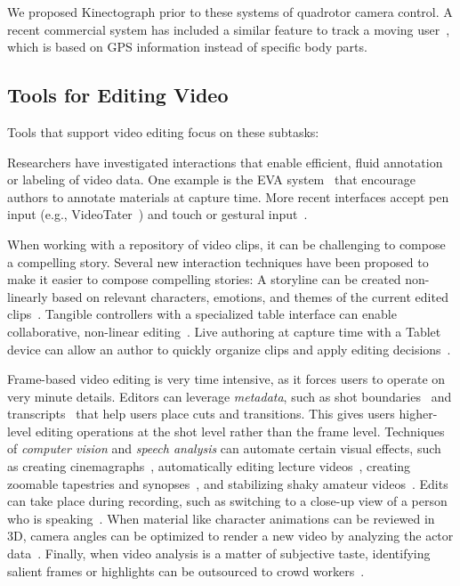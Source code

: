 We proposed Kinectograph prior to these systems of quadrotor camera control. A recent commercial system has included a similar feature to track a moving user~\cite{HexoDrone}, which is based on GPS information instead of specific body parts.


\subsection{Tools for Editing Video}
Tools that support video editing focus on these subtasks:

Researchers have investigated interactions that enable efficient, fluid annotation or labeling of video data. One example is the EVA system~\cite{Mackay:1989} that encourage authors to annotate materials at capture time. More recent interfaces accept pen input (e.g., VideoTater~\cite{Diakopoulos:2006vt}) and touch or gestural input~\cite{Sarkar:2016:SCC:2858036.2858199}.

When working with a repository of video clips, it can be challenging to compose a compelling story. Several new interaction techniques have been proposed to make it easier to compose compelling stories:
%
A storyline can be created non-linearly based on relevant characters, emotions, and themes of the current edited clips~\cite{Shen:2009:WNE:1518701.1518825}.
%
Tangible controllers with a specialized table interface can enable collaborative, non-linear editing~\cite{Bartindale:2012:STS:2207676.2207700,Bartindale:2016:TSS:2818048.2819929}.
%
Live authoring at capture time with a Tablet device can allow an author to quickly organize clips and apply editing decisions~\cite{Freeman:2014:LLA:2611105.2557304}.

Frame-based video editing is very time intensive, as it forces users to operate on very minute details. Editors can leverage \emph{metadata}, such as shot boundaries~\cite{Casares:2002dx} and transcripts~\cite{Berthouzoz:2012} that help users place cuts and transitions. This gives users higher-level editing operations at the shot level rather than the frame level.
%
Techniques of \emph{computer vision} and \emph{speech analysis} can automate certain visual effects, such as creating cinemagraphs~\cite{Bai:2012, Joshi:2012}, automatically editing lecture videos~\cite{Heck:2007}, creating zoomable tapestries and synopses~\cite{Barnes:2010,Pritch:2009vl}, and stabilizing shaky amateur videos~\cite{Liu:2011}.
%
Edits can take place during recording, such as switching to a close-up view of a person who is speaking~\cite{Ranjan:2010}.
%
When material like character animations can be reviewed in 3D, camera angles can be optimized to render a new video by analyzing the actor data~\cite{assa2005action,assa2008motion}.
%
Finally, when video analysis is a matter of subjective taste, identifying salient frames or highlights can be outsourced to crowd workers~\cite{Bernstein:2011uj,Tang:2012:ECS:2207676.2208622}.

